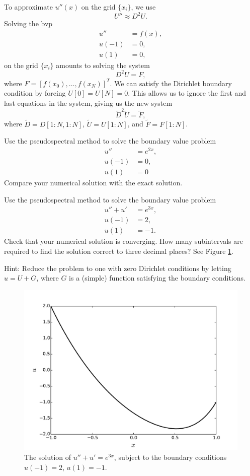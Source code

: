 To approximate $u''(x)$ on the grid $\{x_i\}$, we use 
\[U'' \approx D^2 U.\]
Solving the bvp
\begin{align*}
u'' &= f(x), \\
u(-1) &= 0, \\
u(1) &= 0,
\end{align*}
on the grid $\{x_i\}$ amounts to solving the system 
\[D^2 U = F,\]
where $F = [f(x_0),\ldots, f(x_N)]^T$. We can satisfy the Dirichlet boundary condition by forcing $U[0] = U[N] = 0$.
This allows us to ignore the first and last equations in the system, giving us the new system 
\[\tilde{D}^2 \tilde{U} = \tilde{F},\]
where $\tilde{D} = D[1:N,1:N]$, $\tilde{U} = U[1:N]$, and $\tilde{F} = F[1:N]$.

\begin{problem}
Use the pseudospectral method to solve the boundary value problem 
\begin{align*}
u'' &= e^{2x}, \\
u(-1) &= 0, \\
u(1) &= 0
\end{align*}
Compare your numerical solution with the exact solution.
\end{problem}

\begin{problem}
Use the pseudospectral method to solve the boundary value problem 
\begin{align*}
u'' + u' &= e^{3x}, \\
u(-1) &= 2, \\
u(1) &= -1.
\end{align*}
Check that your numerical solution is converging.
How many subintervals are required to find the solution correct to three decimal places?
See Figure \ref{fig:Spectral1_nonzeroDirichlet}.
	
Hint: Reduce the problem to one with zero Dirichlet conditions by letting $u = U+G$, where $G$ is a (simple) function satisfying the boundary conditions.
\end{problem}

\begin{figure}[ht]
\centering
\includegraphics[width=12cm]{nonzeroDirichlet.pdf}
\caption{The solution of $u'' + u' = e^{3x}$, subject to the boundary conditions 
$u(-1) = 2$, $u(1) = -1$.
 }
\label{fig:Spectral1_nonzeroDirichlet}
\end{figure}

